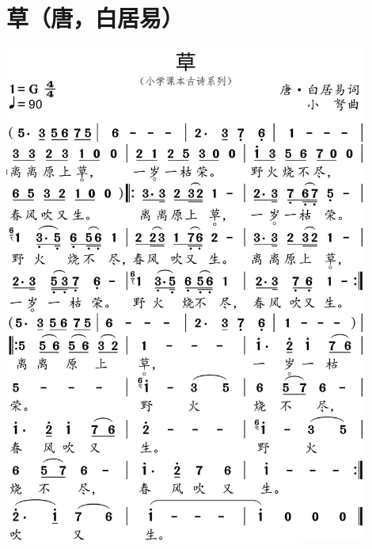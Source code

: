 \documentclass[cn,pad,twocol]{elegantbook}
\begin{document}
\section{草（唐，白居易）}
    \includegraphics[width=0.9\textwidth]{dongxiao/20200627-古诗-草.jpg}   
\end{document}
